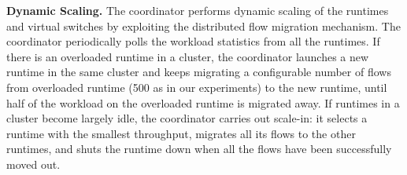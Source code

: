 \textbf{Dynamic Scaling.} The coordinator performs dynamic scaling of the runtimes and virtual switches by exploiting the distributed flow migration mechanism.
The coordinator periodically polls the workload statistics from all the runtimes.
If there is an overloaded runtime in a cluster, the coordinator launches a new runtime in the same cluster and keeps migrating a configurable number of flows from overloaded runtime (500 as in our experiments) to the new runtime, until half of the workload on the overloaded runtime is migrated away. %
If runtimes in a cluster become largely idle, the coordinator carries out scale-in: it selects a runtime with the smallest throughput, migrates all its flows to the other runtimes, and shuts the runtime down when all the flows have been successfully moved out.

